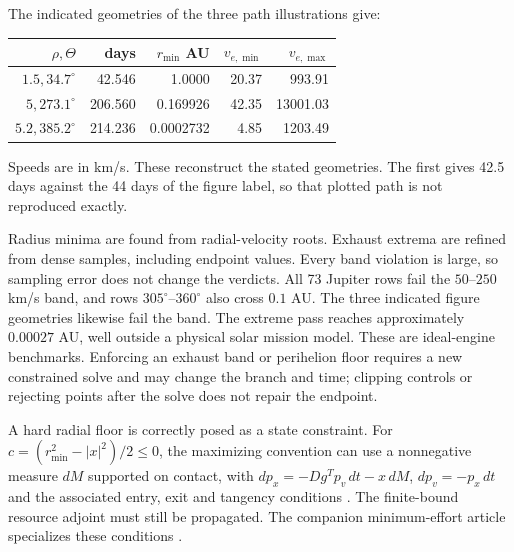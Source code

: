 \documentclass[journal,a4paper]{IEEEtran}
\begin{document}
The indicated geometries of the three path illustrations give:
\begin{center}\small
\begin{tabular}{rrrrr}\toprule
$\rho,\Theta$ & days & $r_{\min}$ AU & $v_{e,\min}$ & $v_{e,\max}$\\\midrule
$1.5,34.7^\circ$ &42.546&1.0000&20.37&993.91\\
$5,273.1^\circ$ &206.560&0.169926&42.35&13001.03\\
$5.2,385.2^\circ$ &214.236&0.0002732&4.85&1203.49\\\bottomrule
\end{tabular}
\end{center}
Speeds are in km/s. These reconstruct the stated geometries. The first
gives 42.5 days against the 44 days of the figure label, so that plotted
path is not reproduced exactly.

Radius minima are found from radial-velocity roots. Exhaust extrema are
refined from dense samples, including endpoint values. Every band
violation is large, so sampling error does not change the verdicts. All 73 Jupiter rows fail the $50$--$250$
km/s band, and rows $305^\circ$--$360^\circ$ also cross $0.1$ AU.
The three indicated figure geometries likewise fail the band. The extreme
pass reaches approximately $0.00027$ AU, well outside a physical solar
mission model. These are ideal-engine benchmarks. Enforcing an exhaust
band or perihelion floor requires a new constrained solve and may change
the branch and time; clipping controls or rejecting points after the solve
does not repair the endpoint.

A hard radial floor is correctly posed as a state constraint. For
$c=(r_{\min}^2-|x|^2)/2\le0$, the maximizing convention can use a
nonnegative measure $dM$ supported on contact, with
$dp_x=-Dg^Tp_v\,dt-x\,dM$, $dp_v=-p_x\,dt$ and the associated
entry, exit and tangency conditions \cite{HartlSethiVickson1995}.
The finite-bound resource adjoint must still be propagated. The companion
minimum-effort article specializes these conditions \cite{OlsinaMinimumEffort}.
\end{document}

